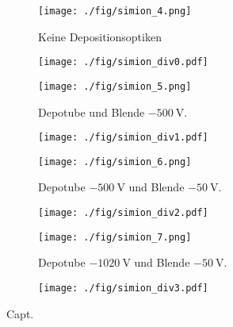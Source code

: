 \begin{figure}
  \begin{subfigure}[h]{0.50\textwidth}
    \texttt{[image: ./fig/simion\_4.png]}
    \caption{Keine Depositionsoptiken}
    \label{fig:div0}
  \end{subfigure}\hfill
  \begin{subfigure}[h]{0.45\textwidth}
    \texttt{[image: ./fig/simion\_div0.pdf]}
    \label{fig:div1}
  \end{subfigure}\hfill
  \begin{subfigure}[h]{0.50\textwidth}
    \texttt{[image: ./fig/simion\_5.png]}
    \caption{Depotube und Blende $\SI{-500}{\volt}$.}
    \label{fig:div2}
  \end{subfigure}\hfill
  \begin{subfigure}[h]{0.45\textwidth}
    \texttt{[image: ./fig/simion\_div1.pdf]}
    \label{fig:div3}
  \end{subfigure}\hfill
  \begin{subfigure}[h]{0.50\textwidth}
    \texttt{[image: ./fig/simion\_6.png]}
    \caption{Depotube $\SI{-500}{\volt}$ und Blende $\SI{-50}{\volt}$.}
    \label{fig:div4}
  \end{subfigure}\hfill
  \begin{subfigure}[h]{0.45\textwidth}
    \texttt{[image: ./fig/simion\_div2.pdf]}
    \label{fig:div5}
  \end{subfigure}\hfill
  \begin{subfigure}[h]{0.50\textwidth}
    \texttt{[image: ./fig/simion\_7.png]}
    \caption{Depotube $\SI{-1020}{\volt}$ und Blende $\SI{-50}{\volt}$.}
    \label{fig:div6}
  \end{subfigure}\hfill
  \begin{subfigure}[h]{0.45\textwidth}
    \texttt{[image: ./fig/simion\_div3.pdf]}
    \label{fig:div7}
  \end{subfigure}
  \caption{Capt.}
  \label{fig:simion_div}
\end{figure}


